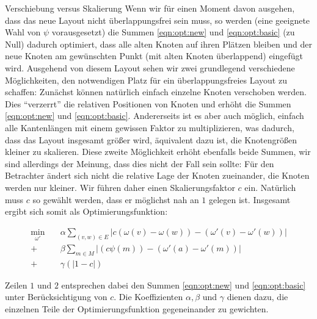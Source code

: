 \begin{paragraph}{Verschiebung versus Skalierung}
  \label{par:scale}
  Wenn wir für einen Moment davon ausgehen, dass das neue Layout nicht überlappungsfrei sein muss, so werden (eine geeignete Wahl von $\psi$ vorausgesetzt) die Summen \ref{eqn:opt:new} und \ref{eqn:opt:basic} (zu Null) dadurch optimiert, dass alle alten Knoten auf ihren Plätzen bleiben und der neue Knoten am gewünschten Punkt (mit alten Knoten überlappend) eingefügt wird. Ausgehend von diesem Layout sehen wir zwei grundlegend verschiedene Möglichkeiten, den notwendigen Platz für ein überlappungsfreies Layout zu schaffen: Zunächst können natürlich einfach einzelne Knoten verschoben werden. Dies "`verzerrt"' die relativen Positionen von Knoten und erhöht die Summen \ref{eqn:opt:new} und \ref{eqn:opt:basic}. Andererseits ist es aber auch möglich, einfach alle Kantenlängen mit einem gewissen Faktor zu multiplizieren, was dadurch, dass das Layout insgesamt größer wird, äquivalent dazu ist, die Knotengrößen kleiner zu skalieren. Diese zweite Möglichkeit erhöht ebenfalls beide Summen, wir sind allerdings der Meinung, dass dies nicht der Fall sein sollte: Für den Betrachter ändert sich nicht die relative Lage der Knoten zueinander, die Knoten werden nur kleiner. Wir führen daher einen Skalierungsfaktor $c$ ein. Natürlich muss $c$ so gewählt werden, dass er möglichst nah an $1$ gelegen ist. Insgesamt ergibt sich somit als Optimierungsfunktion:
\end{paragraph}

\begin{align}
  \label{eqn:opt:complete}
 \min_{\omega'} \quad & \alpha \sum \limits_{(v,w) \in E} {|c(\omega(v) - \omega(w)) - (\omega'(v) - \omega'(w))|} \nonumber \\
  + & \beta \sum \limits_{m \in M} {|(c\psi(m)) - (\omega'(a) - \omega'(m))|} \nonumber \\
  + & \gamma (|1 - c|)
\end{align}

Zeilen $1$ und $2$ entsprechen dabei den Summen \ref{eqn:opt:new} und \ref{eqn:opt:basic} unter Berücksichtigung von $c$. Die Koeffizienten $\alpha, \beta$ und $\gamma$ dienen dazu, die einzelnen Teile der Optimierungsfunktion gegeneinander zu gewichten.
